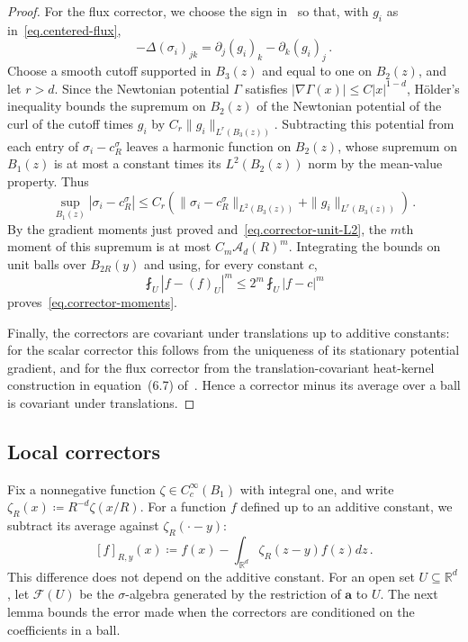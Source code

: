 \documentclass[11pt]{amsart}
\theoremstyle{definition}
\theoremstyle{remark}
\numberwithin{equation}{section}
\newcommand{\R}{\mathbb R}
\renewcommand{\a}{\mathbf a}
\newcommand{\cA}{\mathcal A}
\begin{document}
\begin{proof}
For the flux corrector, we choose the sign in~\citet[Lemma~6.1]{AKM2019book} so that, with $g_i$ as in~\eqref{eq.centered-flux},
\begin{equation*}
 -\Delta(\sigma_i)_{jk}=\partial_j(g_i)_k-\partial_k(g_i)_j\, .
\end{equation*}
Choose a smooth cutoff supported in $B_3(z)$ and equal to one on $B_2(z)$, and let $r>d$. Since the Newtonian potential $\Gamma$ satisfies $|\nabla\Gamma(x)|\leq C|x|^{1-d}$, H\"older's inequality bounds the supremum on $B_2(z)$ of the Newtonian potential of the curl of the cutoff times $g_i$ by $C_r\|g_i\|_{L^r(B_3(z))}$. Subtracting this potential from each entry of $\sigma_i-c_R^\sigma$ leaves a harmonic function on $B_2(z)$, whose supremum on $B_1(z)$ is at most a constant times its $L^2(B_2(z))$ norm by the mean-value property. Thus
\begin{equation*}
 \sup_{B_1(z)}|\sigma_i-c_R^\sigma|
 \leq C_r\left(\|\sigma_i-c_R^\sigma\|_{L^2(B_3(z))}
 +\|g_i\|_{L^r(B_3(z))}\right)\, .
\end{equation*}
By the gradient moments just proved and~\eqref{eq.corrector-unit-L2}, the $m$th moment of this supremum is at most $C_m\cA_d(R)^m$. Integrating the bounds on unit balls over $B_{2R}(y)$ and using, for every constant $c$,
\begin{equation*}
 \fint_U|f-(f)_U|^m\leq2^m\fint_U|f-c|^m
\end{equation*}
proves~\eqref{eq.corrector-moments}.

Finally, the correctors are covariant under translations up to additive constants: for the scalar corrector this follows from the uniqueness of its stationary potential gradient, and for the flux corrector from the translation-covariant heat-kernel construction in equation~(6.7) of~\citet{AKM2019book}. Hence a corrector minus its average over a ball is covariant under translations.
\end{proof}

\subsection{Local correctors}
\label{ss.refined-local-correctors}

Fix a nonnegative function $\zeta\in C_c^\infty(B_1)$ with integral one, and write $\zeta_R(x)\coloneqq R^{-d}\zeta(x/R)$. For a function $f$ defined up to an additive constant, we subtract its average against $\zeta_R(\cdot-y)$:
\begin{equation}\label{eq.refined-centering}
 [f]_{R,y}(x)\coloneqq f(x)-\int_{\R^d}\zeta_R(z-y)f(z)dz\, .
\end{equation}
This difference does not depend on the additive constant. For an open set $U\subseteq\R^d$, let $\mathcal F(U)$ be the $\sigma$-algebra generated by the restriction of $\a$ to $U$. The next lemma bounds the error made when the correctors are conditioned on the coefficients in a ball.
\end{document}
